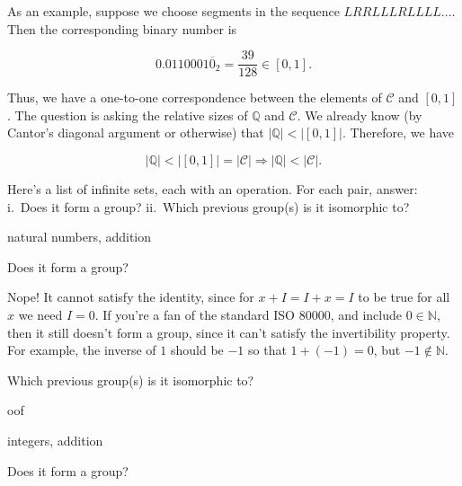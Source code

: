 \documentclass[../gatm_answers.tex]{subfiles}
\begin{document}
As an example, suppose we choose segments in the sequence $LRRLLLRLLLL...$. Then the corresponding binary number is

$$0.0110001\overline{0}_2=\frac{39}{128}\in [0,1].$$

Thus, we have a one-to-one correspondence between the elements of $\mathcal{C}$ and $[0,1]$. The question is asking the relative sizes of $\mathbb{Q}$ and $\mathcal{C}$. We already know (by Cantor's diagonal argument or otherwise) that $|\mathbb{Q}| < |[0,1]|$. Therefore, we have

$$|\mathbb{Q}| < |[0,1]| = |\mathcal{C}| \Longrightarrow |\mathbb{Q}| < |\mathcal{C}|.$$

\begin{outer_problem}
\item Here’s a list of infinite sets, each with an operation. For each pair, answer: i.~Does it form a group? ii.~Which previous group(s) is it isomorphic to?
\end{outer_problem}

\begin{inner_problem}[start=1]
\item natural numbers, addition
\end{inner_problem}

\begin{iinner_problem}[start=1]
\item Does it form a group?
\end{iinner_problem}

Nope! It cannot satisfy the identity, since for $x+I=I+x=I$ to be true for all $x$ we need $I=0$. If you're a fan of the standard ISO 80000, and include $0\in\mathbb{N}$, then it still doesn't form a group, since it can't satisfy the invertibility property. For example, the inverse of $1$ should be $-1$ so that $1+(-1)=0$, but $-1 \not\in \mathbb{N}$.

\begin{iinner_problem}
\item Which previous group(s) is it isomorphic to?
\end{iinner_problem}

oof

\begin{inner_problem}
\item integers, addition
\end{inner_problem}

\begin{iinner_problem}[start=1]
\item Does it form a group?
\end{iinner_problem}
\end{document}
